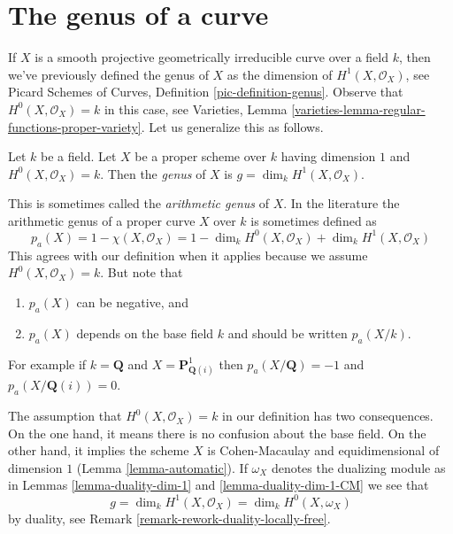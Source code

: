 \section{The genus of a curve}
\label{section-genus}

\noindent
If $X$ is a smooth projective geometrically irreducible curve over a field $k$,
then we've previously defined the genus of $X$ as the dimension of
$H^1(X, \mathcal{O}_X)$, see
Picard Schemes of Curves, Definition \ref{pic-definition-genus}.
Observe that $H^0(X, \mathcal{O}_X) = k$ in this case, see
Varieties, Lemma \ref{varieties-lemma-regular-functions-proper-variety}.
Let us generalize this as follows.

\begin{definition}
\label{definition-genus}
Let $k$ be a field. Let $X$ be a proper scheme over $k$ having
dimension $1$ and $H^0(X, \mathcal{O}_X) = k$.
Then the {\it genus} of $X$ is $g = \dim_k H^1(X, \mathcal{O}_X)$.
\end{definition}

\noindent
This is sometimes called the {\it arithmetic genus} of $X$.
In the literature the arithmetic genus of a proper curve $X$
over $k$ is sometimes defined as
$$
p_a(X) = 1 - \chi(X, \mathcal{O}_X) =
1 - \dim_k H^0(X, \mathcal{O}_X) + \dim_k H^1(X, \mathcal{O}_X)
$$
This agrees with our definition when it applies because we assume
$H^0(X, \mathcal{O}_X) = k$. But note that
\begin{enumerate}
\item $p_a(X)$ can be negative, and
\item $p_a(X)$ depends on the base field $k$ and should be written $p_a(X/k)$.
\end{enumerate}
For example if $k = \mathbf{Q}$
and $X = \mathbf{P}^1_{\mathbf{Q}(i)}$ then
$p_a(X/\mathbf{Q}) = -1$ and $p_a(X/\mathbf{Q}(i)) = 0$.

\medskip\noindent
The assumption that $H^0(X, \mathcal{O}_X) = k$ in our definition has
two consequences. On the one hand, it means there is no confusion about
the base field. On the other hand, it implies the scheme $X$ is
Cohen-Macaulay and equidimensional of dimension $1$
(Lemma \ref{lemma-automatic}). If $\omega_X$ denotes the dualizing
module as in Lemmas \ref{lemma-duality-dim-1} and
\ref{lemma-duality-dim-1-CM} we see that
\begin{equation}
\label{equation-genus}
g = \dim_k H^1(X, \mathcal{O}_X) = \dim_k H^0(X, \omega_X)
\end{equation}
by duality, see Remark \ref{remark-rework-duality-locally-free}.

